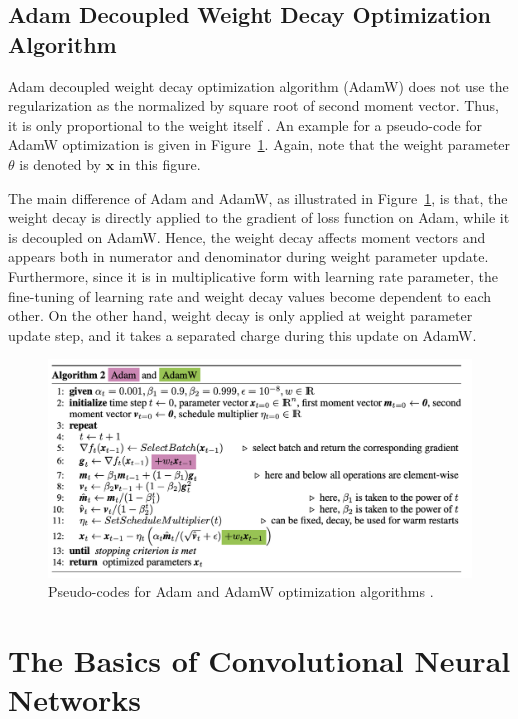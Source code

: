 \subsection{Adam Decoupled Weight Decay Optimization Algorithm}

Adam decoupled weight decay optimization algorithm (AdamW) does not use the regularization as the normalized by square root of second moment vector. Thus, it is only proportional to the weight itself \cite{Adam}. An example for a pseudo-code for AdamW optimization is given in Figure~\ref{fig:adam_and_adamw}. Again, note that the weight parameter $\theta$ is denoted by $\textbf{x}$ in this figure.

The main difference of Adam and AdamW, as illustrated in Figure~\ref{fig:adam_and_adamw}, is that, the weight decay is directly applied to the gradient of loss function on Adam, while it is decoupled on AdamW. Hence, the weight decay affects moment vectors and appears both in numerator and denominator during weight parameter update. Furthermore, since it is in multiplicative form with learning rate parameter, the fine-tuning of learning rate and weight decay values become dependent to each other. On the other hand, weight decay is only applied at weight parameter update step, and it takes a separated charge during this update on AdamW.

\begin{figure}[h]
	\centering
	\includegraphics[width=\linewidth]{fig/adam_n_adamw.png}
	\vspace*{1mm}
	\caption{Pseudo-codes for Adam and AdamW optimization algorithms \cite{weight_decay_regularization}.}
	\label{fig:adam_and_adamw}
\end{figure}

\section{The Basics of Convolutional Neural Networks} 
\label{sec:basics_of_cnn}

